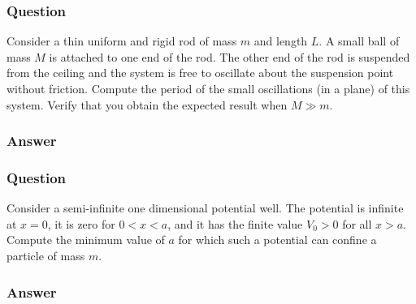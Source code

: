 \subsubsection{Question}

Consider a thin uniform and rigid rod of mass $m$ and length $L$. A small ball of mass $M$ is attached to one end of the rod. The other end of the rod is suspended from the ceiling and the system is free to oscillate about the suspension point without friction. Compute the period of the small oscillations (in a plane) of this system. Verify that you obtain the expected result when $M \gg m$.

\subsubsection{Answer}


\subsubsection{Question}
Consider a semi-infinite one dimensional potential well. The potential is infinite at $x = 0$, it is zero for $0 < x < a$, and it has the finite value $V_0 > 0$ for all $x > a$. Compute the minimum value of $a$ for which such a potential can confine a particle of mass $m$.

\subsubsection{Answer}



